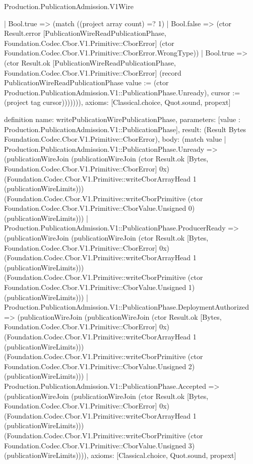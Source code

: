 \begin{lexlean}{Production.PublicationAdmission.V1Wire}
\begin{semanticmodule}
{        | Bool.true => (match ((project array count) =? 1)
          | Bool.false => (ctor Result.error [PublicationWireReadPublicationPhase, Foundation.Codec.Cbor.V1.Primitive::CborError] (ctor Foundation.Codec.Cbor.V1.Primitive::CborError.WrongType))
          | Bool.true => (ctor Result.ok [PublicationWireReadPublicationPhase, Foundation.Codec.Cbor.V1.Primitive::CborError] (record PublicationWireReadPublicationPhase {value := (ctor Production.PublicationAdmission.V1::PublicationPhase.Unready), cursor := (project tag cursor)})))))),
  axioms: [Classical.choice, Quot.sound, propext]
}

definition{
  name: writePublicationWirePublicationPhase,
  parameters: [value : Production.PublicationAdmission.V1::PublicationPhase],
  result: (Result Bytes Foundation.Codec.Cbor.V1.Primitive::CborError),
  body: (match value
    | Production.PublicationAdmission.V1::PublicationPhase.Unready => (publicationWireJoin (publicationWireJoin (ctor Result.ok [Bytes, Foundation.Codec.Cbor.V1.Primitive::CborError] 0x) (Foundation.Codec.Cbor.V1.Primitive::writeCborArrayHead 1 (publicationWireLimits))) (Foundation.Codec.Cbor.V1.Primitive::writeCborPrimitive (ctor Foundation.Codec.Cbor.V1.Primitive::CborValue.Unsigned 0) (publicationWireLimits)))
    | Production.PublicationAdmission.V1::PublicationPhase.ProducerReady => (publicationWireJoin (publicationWireJoin (ctor Result.ok [Bytes, Foundation.Codec.Cbor.V1.Primitive::CborError] 0x) (Foundation.Codec.Cbor.V1.Primitive::writeCborArrayHead 1 (publicationWireLimits))) (Foundation.Codec.Cbor.V1.Primitive::writeCborPrimitive (ctor Foundation.Codec.Cbor.V1.Primitive::CborValue.Unsigned 1) (publicationWireLimits)))
    | Production.PublicationAdmission.V1::PublicationPhase.DeploymentAuthorized => (publicationWireJoin (publicationWireJoin (ctor Result.ok [Bytes, Foundation.Codec.Cbor.V1.Primitive::CborError] 0x) (Foundation.Codec.Cbor.V1.Primitive::writeCborArrayHead 1 (publicationWireLimits))) (Foundation.Codec.Cbor.V1.Primitive::writeCborPrimitive (ctor Foundation.Codec.Cbor.V1.Primitive::CborValue.Unsigned 2) (publicationWireLimits)))
    | Production.PublicationAdmission.V1::PublicationPhase.Accepted => (publicationWireJoin (publicationWireJoin (ctor Result.ok [Bytes, Foundation.Codec.Cbor.V1.Primitive::CborError] 0x) (Foundation.Codec.Cbor.V1.Primitive::writeCborArrayHead 1 (publicationWireLimits))) (Foundation.Codec.Cbor.V1.Primitive::writeCborPrimitive (ctor Foundation.Codec.Cbor.V1.Primitive::CborValue.Unsigned 3) (publicationWireLimits)))),
  axioms: [Classical.choice, Quot.sound, propext]
}


\end{semanticmodule}
\end{lexlean}
